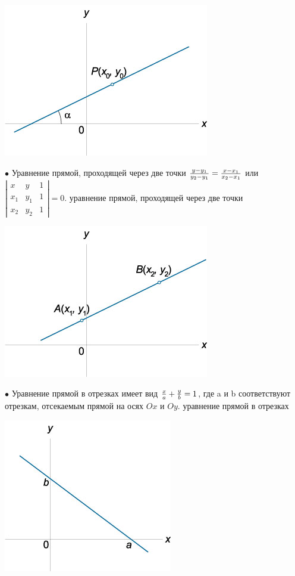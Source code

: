 \documentclass[oneside]{book}
\begin{document}
\begin{itemize}
\begin{enumerate}
\begin{center}
\includegraphics[scale=0.4]{./pics/5.jpg}
\end{center}

$\bullet$ Уравнение прямой, проходящей через две точки  
$\large\frac{{y - {y_1}}}{{{y_2} - {y_1}}}\normalsize = \large\frac{{x - {x_1}}}{{{x_2} - {x_1}}}\normalsize$  или $ \left| {\begin{array}{*{20}{c}} x & y & 1\\ {{x_1}} & {{y_1}} & 1\\ {{x_2}} & {{y_2}} & 1 \end{array}} \right| = 0$.
уравнение прямой, проходящей через две точки

\begin{center}
\includegraphics[scale=0.4]{./pics/6.jpg}
\end{center}

$\bullet$ Уравнение прямой в отрезках имеет вид
$\large\frac{x}{a}\normalsize + \large\frac{y}{b}\normalsize = 1$,
где a и b соответствуют отрезкам, отсекаемым прямой на осях $Ox$ и $Oy$.
уравнение прямой в отрезках
\begin{center}
\includegraphics[scale=0.4]{./pics/7.jpg}
\end{center}


\end{enumerate}
\end{itemize}
\end{document}

